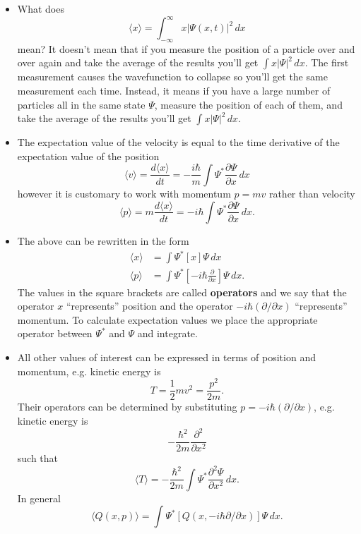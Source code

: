 \documentclass{article}
\newcommand{\ev}[1]{\langle #1 \rangle}
\begin{document}
\begin{itemize}
  \item What does \[\ev{x} = \int_{-\infty}^\infty x |\Psi(x, t)|^2 \,d x\] mean? It doesn't mean that if you measure the position of a particle over and over again and take the average of the results you'll get $\int x |\Psi|^2 \,d x$. The first measurement causes the wavefunction to collapse so you'll get the same measurement each time. Instead, it means if you have a large number of particles all in the same state $\Psi$, measure the position of each of them, and take the average of the results you'll get $\int x |\Psi|^2 \,d x$.

  \item The expectation value of the velocity is equal to the time derivative of the expectation value of the position \[\ev{v} = \frac{d \ev{x}}{d t} = -\frac{i \hbar}{m} \int \Psi^* \frac{\partial \Psi}{\partial x} \,d x\] however it is customary to work with momentum $p = m v$ rather than velocity \[\ev{p} = m \frac{d \ev{x}}{d t} = -i \hbar \int \Psi^* \frac{\partial \Psi}{\partial x} \,d x.\]

  \item The above can be rewritten in the form \begin{align*}
          \ev{x} & = \int \Psi^* [x] \Psi \,d x                                                  \\
          \ev{p} & = \int \Psi^* \left[ -i \hbar \frac{\partial}{\partial x} \right] \Psi \,d x.
        \end{align*} The values in the square brackets are called \textbf{operators} and we say that the operator $x$ ``represents'' position and the operator $-i \hbar (\partial / \partial x)$ ``represents'' momentum. To calculate expectation values we place the appropriate operator between $\Psi^*$ and $\Psi$ and integrate.

  \item All other values of interest can be expressed in terms of position and momentum, e.g. kinetic energy is \[T = \frac{1}{2} m v^2 = \frac{p^2}{2 m}.\] Their operators can be determined by substituting $p = -i \hbar (\partial / \partial x)$, e.g. kinetic energy is \[-\frac{\hbar^2}{2 m} \frac{\partial^2}{\partial x^2}\] such that \[\ev{T} = -\frac{\hbar^2}{2 m} \int \Psi^* \frac{\partial^2 \Psi}{\partial x^2} \,d x.\] In general \[\ev{Q(x, p)} = \int \Psi^* \left[ Q(x, -i \hbar \partial / \partial x) \right] \Psi \,d x.\]
\end{itemize}
\end{document}
